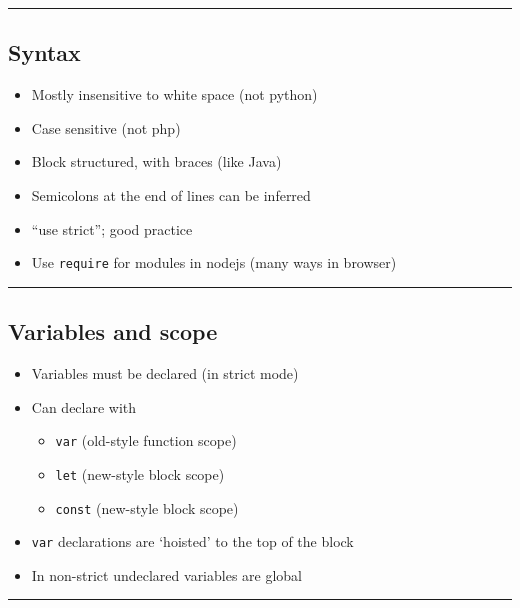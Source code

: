 \begin{center}\rule{0.5\linewidth}{\linethickness}\end{center}

\hypertarget{syntax}{%
\subsection{Syntax}\label{syntax}}

\begin{itemize}
\tightlist
\item
  Mostly insensitive to white space (not python)
\item
  Case sensitive (not php)
\item
  Block structured, with braces (like Java)
\item
  Semicolons at the end of lines can be inferred
\item
  ``use strict''; good practice
\item
  Use \texttt{require} for modules in nodejs (many ways in browser)
\end{itemize}

\begin{center}\rule{0.5\linewidth}{\linethickness}\end{center}

\hypertarget{variables-and-scope}{%
\subsection{Variables and scope}\label{variables-and-scope}}

\begin{itemize}
\tightlist
\item
  Variables must be declared (in strict mode)
\item
  Can declare with

  \begin{itemize}
  \tightlist
  \item
    \texttt{var} (old-style function scope)
  \item
    \texttt{let} (new-style block scope)
  \item
    \texttt{const} (new-style block scope)
  \end{itemize}
\item
  \texttt{var} declarations are `hoisted' to the top of the block
\item
  In non-strict undeclared variables are global
\end{itemize}

\begin{center}\rule{0.5\linewidth}{\linethickness}\end{center}

